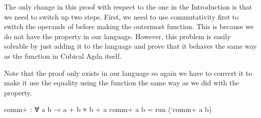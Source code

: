 The only change in this proof with respect to the one in the Introduction is that
we need to switch up two steps. First, we need to use commutativity first to switch the
operands of \AgdaFunction{\_+\_} before making  the outermost function.
This is because we do not have the  property in our language.
However, this problem is easily solvable by just adding it to the language and
prove that it behaves the same way as the  function in Cubical Agda itself.

Note that the proof only exists in our language so again we have to convert
it to make it use the equality using the  function the same
way as we did with the  property.

\begin{code}
comm+ : ∀ a b → a + b ≡ b + a
comm+ a b = run (`comm+ a b)
\end{code}

